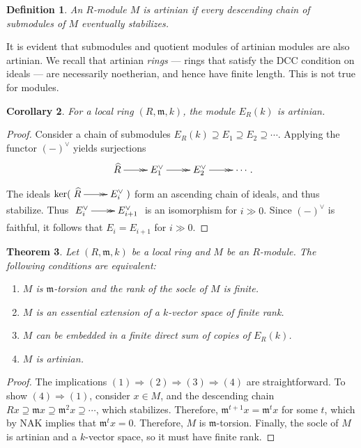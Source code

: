 \documentclass[11pt]{book}
\newtheorem{theorem}{Theorem}[chapter]
\newtheorem{corollary}[theorem]{Corollary}
\newtheorem{definition}[theorem]{Definition}
\numberwithin{equation}{section}
\numberwithin{theorem}{chapter}
\theoremstyle{definition}
\newtheorem*{basic properties}{Basic Properties}
\newtheorem*{Important Remark}{Important Remark}
\theoremstyle{remark}
\newcommand{\m}{\mathfrak{m}}
\renewcommand{\ker}{\operatorname{ker}}
\begin{document}
\begin{definition}
	An $R$-module $M$ is \emph{artinian} if every descending chain of submodules of $M$ eventually stabilizes.
\end{definition}

It is evident that submodules and quotient modules of artinian modules are also artinian. We recall that artinian \emph{rings} --- rings that satisfy the DCC condition on ideals --- are necessarily noetherian, and hence have finite length. This is not true for modules.


\begin{corollary}
	For a local ring $(R,\m,k)$, the module $E_R(k)$ is artinian.
\end{corollary}


\begin{proof}
	Consider a chain of submodules $E_R(k) \supseteq E_1 \supseteq E_2 \supseteq \cdots$. Applying the functor $(-)^{\vee}$ yields surjections
	$$\xymatrix{\widehat{R} \ar@{->>}[r] & E_1^{\vee} \ar@{->>}[r] & E_2^{\vee} \ar@{->>}[r] & \cdots}.$$
	The ideals $\ker(\xymatrix{\widehat{R} \ar@{->>}[r] & E_i^{\vee} })$ form an ascending chain of ideals, and thus stabilize. Thus $\xymatrix{E_i^{\vee} \ar@{->>}[r] & E_{i+1}^{\vee}}$ is an isomorphism for $i \gg 0$. Since $(-)^\vee$ is faithful, it follows that $E_i = E_{i+1}$ for $i \gg 0$.
\end{proof}


\begin{theorem}
	Let $(R,\m,k)$ be a local ring and $M$ be an $R$-module. The following conditions are equivalent:
	\begin{enumerate}[(1)]
		\item $M$ is $\m$-torsion and the rank of the socle of $M$ is finite.
		\item $M$ is an essential extension of a $k$-vector space of finite rank.
		\item $M$ can be embedded in a finite direct sum of copies of $E_R(k)$.
		\item $M$ is artinian.
	\end{enumerate}
\end{theorem}


\begin{proof}
	The implications $(1) \Rightarrow (2) \Rightarrow (3) \Rightarrow (4)$ are straightforward.
	To show $(4) \Rightarrow (1)$, consider $x \in M$, and the descending chain $Rx \supseteq \m x \supseteq \m^2 x \supseteq \cdots$, which stabilizes. Therefore, $\m^{t+1} x = \m^t x$ for some $t$, which by NAK implies that $\m^t x = 0$. Therefore, $M$ is $\m$-torsion. Finally, the socle of $M$ is artinian and a $k$-vector space, so it must have finite rank.
\end{proof}
\end{document}
